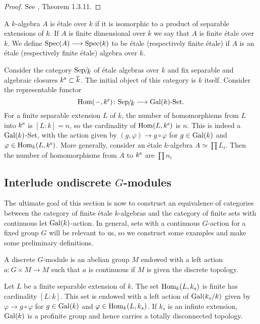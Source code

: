 \begin{proof}
	See \cite{Szamuely}, Theorem 1.3.11.
\end{proof}

\begin{definition}
	A $k$-algebra $A$ is \'etale over $k$ if it is isomorphic to a product of separable extensions of $k$. If $A$ is finite dimensional over $k$ we say that $A$ is finite \'etale over $k$. We define $\operatorname{Spec}(A) \longrightarrow \operatorname{Spec}(k)$ to be \'etale (respectively finite \'etale) if $A$ is an \'etale (respectively finite \'etale) algebra over $k$.
\end{definition}

\begin{construction}
	Consider the category $\Sepk$ of \'etale algebras over $k$ and fix separable and algebraic closures $k^{\text{s}} \subset \overline{k}$. The initial object of this category is $k$ itself. Consider the representable functor
	\[
		\Hom(-, k^\sep) \colon \Sepk \to \Gal(k)\text{-Set}.
	\]
	For a finite separable extension $L$ of $k$, the number of homomorphisms from $L$ into $k^{\text{s}}$ is $[L:k] = n$, so the cardinality of $\operatorname{Hom}(L, k^{\text{s}})$ is $n$. This is indeed a $\operatorname{Gal}(k)$-Set, with the action given by $(g, \varphi) \to g \circ \varphi$ for $g \in \operatorname{Gal}(k)$ and $\varphi \in \operatorname{Hom}_k(L, k^{\text{s}})$. More generally, consider an \'etale $k$-algebra $A \simeq \prod L_i$. Then the number of homomorphisms from $A$ to $k^{\text{s}}$ are $\prod n_i$
\end{construction}

\subsection{Interlude ondiscrete \texorpdfstring{$G$}{G}-modules}
The ultimate goal of this section is now to construct an equivalence of categories between the category of finite \'etale $k$-algebras and the category of finite sets with continuous let $\operatorname{Gal}(k)$-action. In general, sets with a continuous $G$-action for a fixed group $G$ will be relevant to us, so we construct some examples and make some preliminary definitions.

\begin{definition}
	A discrete $G$-module is an abelian group $M$ endowed with a left action $a: G \times M \to M$ such that $a$ is continuous if $M$ is given the discrete topology.
\end{definition}

\begin{example}
	Let	$L$ be a finite separable extension of $k$. The set $\operatorname{Hom}_k(L, k_s)$ is finite has cardinality $[L:k]$. This set is endowed with a left action of $\operatorname{Gal}(k_s/k)$ given by $\varphi \to g \circ \varphi$ for $g \in \operatorname{Gal}(k)$ and $\varphi \in \operatorname{Hom}_k(L, k_s)$. If $k_s$ is an infinte extension, $\operatorname{Gal}(k)$ is a profinite group and hence carries a totally disconnected topology.
\end{example}

